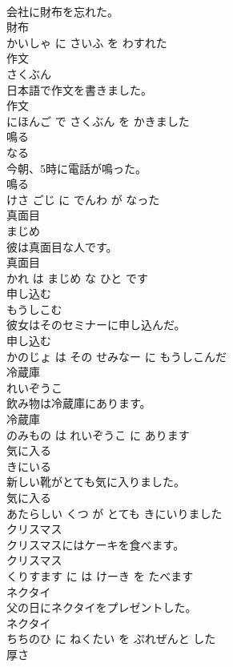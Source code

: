 \documentclass[8pt]{extreport}
\begin{document}
\begin{CJK}{UTF8}{min}
\\	会社に財布を忘れた。	
\\	財布 
\\	かいしゃ に さいふ を わすれた			
\\	作文	
\\	さくぶん			
\\	日本語で作文を書きました。	
\\	作文 
\\	にほんご で さくぶん を かきました			
\\	鳴る	
\\	なる			
\\	今朝、5時に電話が鳴った。	
\\	鳴る 
\\	けさ ごじ に でんわ が なった			
\\	真面目	
\\	まじめ			
\\	彼は真面目な人です。	
\\	真面目 
\\	かれ は まじめ な ひと です			
\\	申し込む	
\\	もうしこむ			
\\	彼女はそのセミナーに申し込んだ。	
\\	申し込む 
\\	かのじょ は その せみなー に もうしこんだ			
\\	冷蔵庫	
\\	れいぞうこ			
\\	飲み物は冷蔵庫にあります。	
\\	冷蔵庫 
\\	のみもの は れいぞうこ に あります			
\\	気に入る	
\\	きにいる			
\\	新しい靴がとても気に入りました。	
\\	気に入る 
\\	あたらしい くつ が とても きにいりました			
\\	クリスマス	
\\	クリスマスにはケーキを食べます。	
\\	クリスマス 
\\	くりすます に は けーき を たべます			
\\	ネクタイ	
\\	父の日にネクタイをプレゼントした。	
\\	ネクタイ 
\\	ちちのひ に ねくたい を ぷれぜんと した			
\\	厚さ	

\end{CJK}
\end{document}
